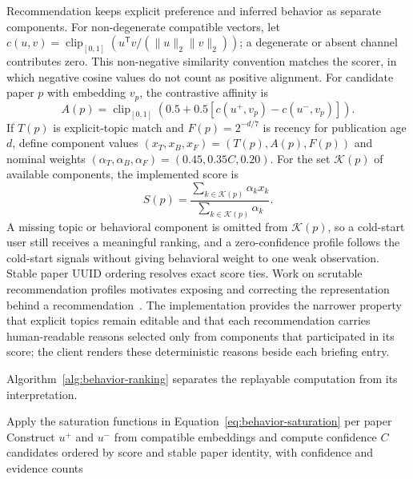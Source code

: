 Recommendation keeps explicit preference and inferred behavior as separate components. For non-degenerate compatible vectors, let \(c(u,v)=\operatorname{clip}_{[0,1]}\!\left(u^{\mathsf T}v/(\lVert u\rVert_2\lVert v\rVert_2)\right)\); a degenerate or absent channel contributes zero. This non-negative similarity convention matches the scorer, in which negative cosine values do not count as positive alignment. For candidate paper \(p\) with embedding \(v_p\), the contrastive affinity is
\begin{equation}
  A(p)=\operatorname{clip}_{[0,1]}\!\left(0.5+0.5\left[c(u^+,v_p)-c(u^-,v_p)\right]\right).
  \label{eq:behavior-affinity}
\end{equation}
If \(T(p)\) is explicit-topic match and \(F(p)=2^{-d/7}\) is recency for publication age \(d\), define component values \((x_T,x_B,x_F)=(T(p),A(p),F(p))\) and nominal weights \((\alpha_T,\alpha_B,\alpha_F)=(0.45,0.35C,0.20)\). For the set \(\mathcal{K}(p)\) of available components, the implemented score is
\begin{equation}
  S(p)=\frac{\sum_{k\in\mathcal{K}(p)}\alpha_k x_k}{\sum_{k\in\mathcal{K}(p)}\alpha_k}.
  \label{eq:recommendation-score}
\end{equation}
A missing topic or behavioral component is omitted from \(\mathcal{K}(p)\), so a cold-start user still receives a meaningful ranking, and a zero-confidence profile follows the cold-start signals without giving behavioral weight to one weak observation. Stable paper UUID ordering resolves exact score ties.
Work on scrutable recommendation profiles motivates exposing and correcting the representation behind a recommendation~\cite{ramos2024scrutable}. The implementation provides the narrower property that explicit topics remain editable and that each recommendation carries human-readable reasons selected only from components that participated in its score; the client renders these deterministic reasons beside each briefing entry.

Algorithm~\ref{alg:behavior-ranking} separates the replayable computation from its interpretation.

\begin{algorithm}[htbp]
  \caption{Replayable contrastive preference update and candidate ranking}
  \label{alg:behavior-ranking}
  Apply the saturation functions in Equation~\ref{eq:behavior-saturation} per paper\;
  Construct \(u^+\) and \(u^-\) from compatible embeddings and compute confidence \(C\)\;
  \Return candidates ordered by score and stable paper identity, with confidence and evidence counts\;
\end{algorithm}

